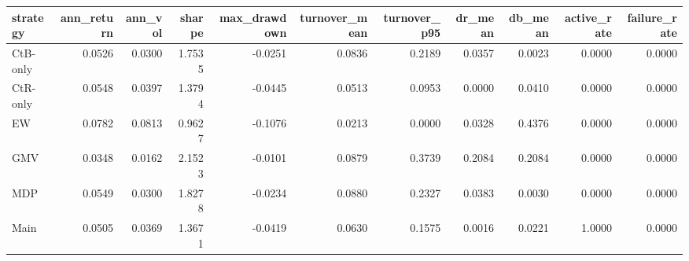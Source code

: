 \begin{tabular}{lrrrrrrrrrr}
\toprule
strategy & ann_return & ann_vol & sharpe & max_drawdown & turnover_mean & turnover_p95 & dr_mean & db_mean & active_rate & failure_rate \\
\midrule
CtB-only & 0.0526 & 0.0300 & 1.7535 & -0.0251 & 0.0836 & 0.2189 & 0.0357 & 0.0023 & 0.0000 & 0.0000 \\
CtR-only & 0.0548 & 0.0397 & 1.3794 & -0.0445 & 0.0513 & 0.0953 & 0.0000 & 0.0410 & 0.0000 & 0.0000 \\
EW & 0.0782 & 0.0813 & 0.9627 & -0.1076 & 0.0213 & 0.0000 & 0.0328 & 0.4376 & 0.0000 & 0.0000 \\
GMV & 0.0348 & 0.0162 & 2.1523 & -0.0101 & 0.0879 & 0.3739 & 0.2084 & 0.2084 & 0.0000 & 0.0000 \\
MDP & 0.0549 & 0.0300 & 1.8278 & -0.0234 & 0.0880 & 0.2327 & 0.0383 & 0.0030 & 0.0000 & 0.0000 \\
Main & 0.0505 & 0.0369 & 1.3671 & -0.0419 & 0.0630 & 0.1575 & 0.0016 & 0.0221 & 1.0000 & 0.0000 \\
\bottomrule
\end{tabular}
